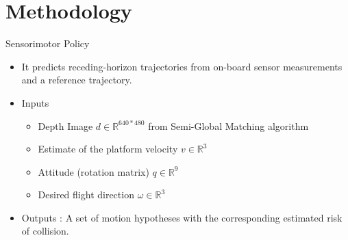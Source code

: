\documentclass{beamer}
\begin{document}
\section{Methodology}
\begin{frame}{Sensorimotor Policy}
	\begin{itemize}
		\item It predicts receding-horizon \autocite{receding_horizon} trajectories from on-board sensor measurements and a reference trajectory.
		
		\item Inputs
		\begin{itemize}
			\item Depth Image $d \in \mathbb{R}^{640*480}$ from Semi-Global Matching algorithm
			\item Estimate of the platform velocity $v \in \mathbb{R}^3$
			\item Attitude (rotation matrix) $q \in \mathbb{R}^9$
			\item Desired flight direction $\omega \in \mathbb{R}^3$
		\end{itemize}
	
		\item Outputs : A set of motion hypotheses with the corresponding estimated risk of collision. 
		
	\end{itemize}
\end{frame}
\end{document}

